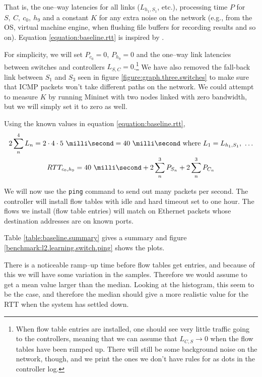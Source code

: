 That is, the one--way latencies for all links ($L_{h_1,S_1}$, etc.), processing time $P$ for
$S,~C,~c_0,~h_9$ and a constant $K$ for any extra noise on the network
(e.g., from the OS, virtual machine engine, when flushing file buffers for
 recording results and so on).
Equation \ref{equation:baseline.rtt} is inspired by \cite{DBLP:conf/cnsm/PhemiusB13}.

For simplicity, we will set $P_{c_0}=0$, $P_{h_9}=0$ and the
one--way link latencies between switches and controllers $L_{S,C}=0$.\footnote{When
flow table entries are installed, one should see very little traffic going
to the controllers, meaning that we can
assume that $L_{C,S} \to 0$ when the flow tables have been ramped up.
There will still be some background noise on the network, though, and we
print the ones we don't have rules for as dots in the controller log.}
We have also removed the fall-back link
between $S_1$ and $S_3$ seen in figure \ref{figure:graph.three.switches}
to make sure that ICMP packets won't take different paths on the network.
We could attempt to measure $K$ by running Mininet with two nodes linked
with zero bandwidth, but we will simply set it to zero as well.

Using the known values in equation \ref{equation:baseline.rtt},
\begin{gather}
  2\sum_n^4 L_n = 2\cdot4\cdot\ms{5} = \ms{40}~\text{where}~L_1 = L_{h_1,S_1},~\dots
  \\
  RTT_{c_0,h_9} = \ms{40} + 2\sum_n^3 P_{S_n} + 2\sum_n^3 P_{C_n}
  \label{equation:expected.baseline.rtt}
\end{gather}

We will now use the \texttt{ping} command to send out many packets per
second.  The controller will install flow tables with idle and hard timeout
set to one hour. The flows we install (flow table entries) will match on
Ethernet packets whose destination addresses are on known ports.

Table \ref{table:baseline.summary} gives a summary and figure
\ref{benchmark:l2.learning.switch.ping} shows the plots.



There is a noticeable ramp--up time before flow tables get entries, and
because of this we will have some variation in the samples. Therefore we
would assume to get a mean value larger than the median.  Looking at the
histogram, this seem to be the case, and therefore the median should give a
more realistic value for the RTT when the system has settled down.

